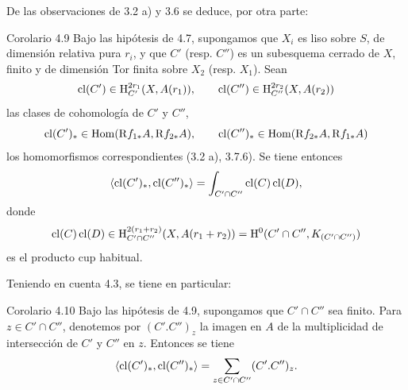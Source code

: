 De las observaciones de 3.2 a) y 3.6 se deduce, por otra parte:

\begin{statement}{Corolario 4.9}
Bajo las hipótesis de 4.7, supongamos que $X_i$ es liso sobre $S$, de dimensión relativa pura $r_i$, y que $C'$ (resp. $C''$) es un subesquema cerrado de $X$, finito y de dimensión Tor finita sobre $X_2$ (resp. $X_1$). Sean
\[
\operatorname{cl}(C')\in \mathrm{H}_{C'}^{2r_1}(X,A(r_1)),\qquad
\operatorname{cl}(C'')\in \mathrm{H}_{C''}^{2r_2}(X,A(r_2))
\]
las clases de cohomología de $C'$ y $C''$,
\[
\operatorname{cl}(C')_*\in\operatorname{Hom}(\mathrm{R} f_{1*}A,\mathrm{R} f_{2*}A),\qquad
\operatorname{cl}(C'')_*\in\operatorname{Hom}(\mathrm{R} f_{2*}A,\mathrm{R} f_{1*}A)
\]
los homomorfismos correspondientes (3.2 a), 3.7.6). Se tiene entonces
\[
\langle \operatorname{cl}(C')_*,\operatorname{cl}(C'')_*\rangle
=
\int_{C'\cap C''}\operatorname{cl}(C)\operatorname{cl}(D),
\]
donde
\[
\operatorname{cl}(C)\operatorname{cl}(D)\in
\mathrm{H}_{C'\cap C''}^{2(r_1+r_2)}(X,A(r_1+r_2))
=
\mathrm{H}^0(C'\cap C'',K_{(C'\cap C'')})
\]
es el producto cup habitual.
\end{statement}

Teniendo en cuenta 4.3, se tiene en particular:

\begin{statement}{Corolario 4.10}
Bajo las hipótesis de 4.9, supongamos que $C'\cap C''$ sea finito. Para $z\in C'\cap C''$, denotemos por $(C'.C'')_z$ la imagen en $A$ de la multiplicidad de intersección de $C'$ y $C''$ en $z$. Entonces se tiene
\[
\langle \operatorname{cl}(C')_*,\operatorname{cl}(C'')_*\rangle
=
\sum_{z\in C'\cap C''}(C'.C'')_z.
\]
\end{statement}

